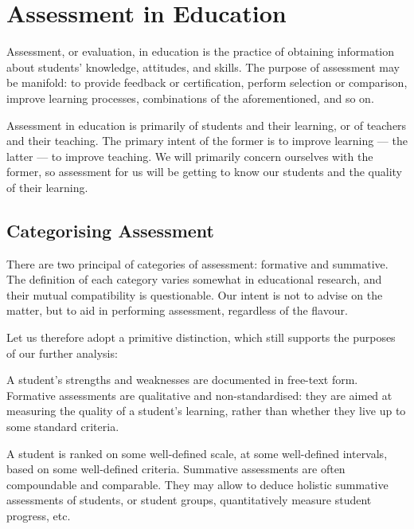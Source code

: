 
\section{Assessment in Education}

\label{section:analysis-assessment-in-education}


Assessment, or evaluation, in education is the practice of obtaining
information about students' knowledge, attitudes, and
skills\cite{assessment-and-burnout}.  The purpose of assessment may be
manifold: to provide feedback or certification, perform selection or
comparison, improve learning processes, combinations of the aforementioned, and
so on\cite{first-ten-years}.

Assessment in education is primarily of students and their learning, or of
teachers and their teaching. The primary intent of the former is to improve
learning --- the latter --- to improve teaching. We will primarily concern
ourselves with the former, so assessment for us will be getting to know our
students and the quality of their learning\cite{ramsden-1992}.

\subsection{Categorising Assessment}

There are two principal of categories of assessment: formative and summative.
The definition of each category varies somewhat in educational
research\cite{bloom1971, sadler1989, formative-vs-summative}, and their mutual
compatibility is questionable\cite{butler1988}. Our intent is not to advise on
the matter, but to aid in performing assessment, regardless of the flavour.

Let us therefore adopt a primitive distinction, which still supports the
purposes of our further analysis:

\begin{description}[\setleftmargin{60pt}\setlabelstyle{\bf}]

\item[Formative] A student's strengths and weaknesses are documented in
free-text form. Formative assessments are qualitative and non-standard\-ised:
they are aimed at measuring the quality of a student's learning, rather than
whether they live up to some standard criteria. 

\item[Summative] A student is ranked on some well-defined scale, at some
well-defined intervals, based on some well-defined criteria. Summative
assessments are often compoundable and comparable. They may allow to deduce
holistic summative assessments of students, or student groups, quantitatively
measure student progress, etc.

\end{description}

